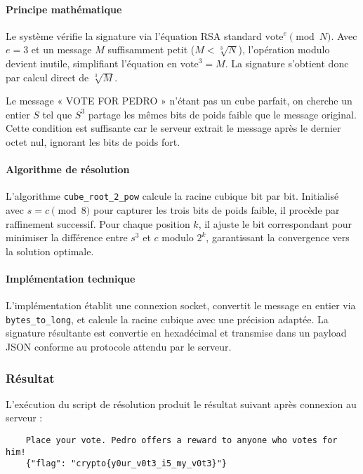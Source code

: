     \paragraph{Principe mathématique}
    Le système vérifie la signature via l'équation RSA standard $\text{vote}^e \pmod{N}$. Avec $e = 3$ et un message $M$ suffisamment petit ($M < \sqrt[3]{N}$), l'opération modulo devient inutile, simplifiant l'équation en $\text{vote}^3 = M$. La signature s'obtient donc par calcul direct de $\sqrt[3]{M}$.
    
    Le message « VOTE FOR PEDRO » n'étant pas un cube parfait, on cherche un entier $S$ tel que $S^3$ partage les mêmes bits de poids faible que le message original. Cette condition est suffisante car le serveur extrait le message après le dernier octet nul, ignorant les bits de poids fort.
 
    \paragraph{Algorithme de résolution}
    L'algorithme \texttt{cube\_root\_2\_pow} calcule la racine cubique bit par bit. Initialisé avec $s = c \pmod{8}$ pour capturer les trois bits de poids faible, il procède par raffinement successif. Pour chaque position $k$, il ajuste le bit correspondant pour minimiser la différence entre $s^3$ et $c$ modulo $2^k$, garantissant la convergence vers la solution optimale.
    
    \paragraph{Implémentation technique}
    L'implémentation établit une connexion socket, convertit le message en entier via \texttt{bytes\_to\_long}, et calcule la racine cubique avec une précision adaptée. La signature résultante est convertie en hexadécimal et transmise dans un payload JSON conforme au protocole attendu par le serveur.
   
    \subsubsection{Résultat}
    L'exécution du script de résolution produit le résultat suivant après connexion au serveur :

    \begin{verbatim}
    Place your vote. Pedro offers a reward to anyone who votes for him!
    {"flag": "crypto{y0ur_v0t3_i5_my_v0t3}"}
    \end{verbatim}

